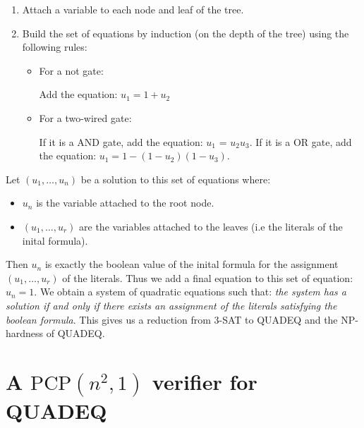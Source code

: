 \documentclass[a4paper,10pt]{article}
\newcommand{\PCP}{\mathrm{PCP}}
\theoremstyle{remark}
\begin{document}
\begin{enumerate}
\item Attach a variable to each node and leaf of the tree.
\item Build the set of equations by induction (on the depth of the tree) using
the following rules:
\begin{itemize}
 \item For a not gate:
\begin{figure}[h]
\begin{center}
\end{center}
\end{figure}

Add the equation: $u_1 = 1+u_2$
\item For a two-wired gate:
\begin{figure}[!h]
\begin{center}
\end{center}
\end{figure}

If it is a \textsf{AND} gate, add the equation: $u_1$ = $u_2u_3$. If it is a
\textsf{OR} gate, add the equation: $u_1 = 1 - (1-u_2)(1-u_3)$.
\end{itemize}
\end{enumerate}

Let $(u_1,\ldots,u_n)$ be a solution to this set of equations where:
\begin{itemize}
 \item $u_n$ is the variable attached to the root node.
\item $(u_1,\ldots,u_r)$ are the variables attached to the leaves (i.e the
literals of the inital formula).
\end{itemize}
Then $u_n$ is exactly the boolean value of the inital formula for the
assignment $(u_1,\ldots,u_r)$ of the literals. Thus we add a final equation to
this set of equation: $u_n=1$. We obtain a system of quadratic equations
such that: \emph{the system has a solution if and only if there
exists an assignment of the literals satisfying the boolean formula}. This
gives us a reduction from \textsf{3-SAT} to \textsf{QUADEQ} and the NP-hardness
of \textsf{QUADEQ}.

\newpage
\section{A $\PCP(n^2,1)$ verifier for \textsf{QUADEQ}}
\end{document}
